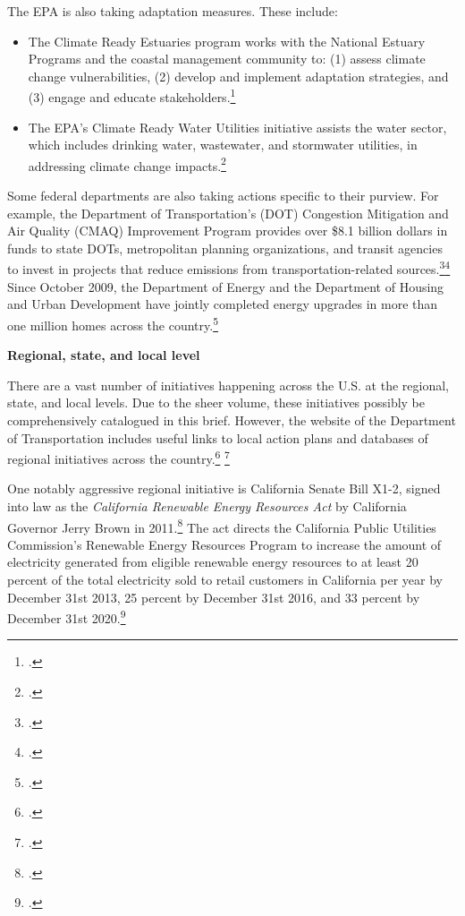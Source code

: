 \documentclass[10pt]{article}
\begin{document}
The EPA is also taking adaptation measures. These include:	
\begin{itemize}
	\item The Climate Ready Estuaries program works with the National Estuary Programs and the coastal management community to: (1) assess climate change vulnerabilities, (2) develop and implement adaptation strategies, and (3) engage and educate stakeholders.\footcite[][]{EPAwater} 
	\item The EPA's Climate Ready Water Utilities initiative assists the water sector, which includes drinking water, wastewater, and stormwater utilities, in addressing climate change impacts.\footcite[][]{EPAwaterutilities}
\end{itemize}
	
	

Some federal departments are also taking actions specific to their purview. For example, the Department of Transportation's (DOT) Congestion Mitigation and Air Quality (CMAQ) Improvement Program provides over \$8.1 billion dollars in funds to state DOTs, metropolitan planning organizations, and transit agencies to invest in projects that reduce emissions from transportation-related sources.\footcite[][]{CMAQ}\footcite[][]{CMAQProgram} Since October 2009, the Department of Energy and the Department of Housing and Urban Development have jointly completed energy upgrades in more than one million homes across the country.\footcite[][]{WHenergy}



\textbf{Regional, state, and local level}



There are a vast number of initiatives happening across the U.S. at the regional, state, and local levels. 
Due to the sheer volume, these initiatives possibly be comprehensively catalogued in this brief. 
However, the website of the Department of Transportation includes useful links to local action plans and databases of regional initiatives across the country.\footcite[][]{USDTaction} \footcite[][]{USDTinitiatives}



One notably aggressive regional initiative is California Senate Bill X1-2, signed into law as the \emph{California Renewable Energy Resources Act} by California Governor Jerry Brown in 2011.\footcite[][]{CaliSBX12}
The act directs the California Public Utilities Commission's Renewable Energy Resources Program to increase the amount of electricity generated from eligible renewable energy resources to at least 20 percent of the total electricity sold to retail customers in California per year by December 31st 2013, 25 percent by December 31st 2016, and 33 percent by December 31st 2020.\footcite[][]{CaliforniaRenewableOverview}
\end{document}
